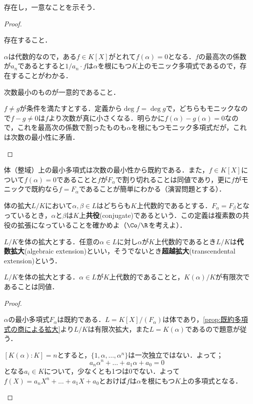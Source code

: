 存在し，一意なことを示そう．
\begin{proof}
	\begin{step}
		\item 存在すること．
		
		$\alpha$は代数的なので，ある$f\in K[X]$がとれて$f(\alpha)=0$となる．$f$の最高次の係数が$a_n$であるとすると$1/a_n\cdot f$は$\alpha$を根にもつ$K$上のモニック多項式であるので，存在することがわかる．
		
		\item 次数最小のものが一意的であること．
		
		$f\neq g$が条件を満たすとする．定義から$\deg f=\deg g$で，どちらもモニックなので$f-g\neq0 $は$f$より次数が真に小さくなる．明らかに$f(\alpha)-g(\alpha)=0$なので，これを最高次の係数で割ったものも$\alpha$を根にもつモニック多項式だが，これは次数の最小性に矛盾．
	\end{step}
\end{proof}

体（整域）上の最小多項式は次数の最小性から既約である．また，$f\in K[X]$について$f(\alpha)=0$であることと$f$が$F_\alpha$で割り切れることは同値であり，更に$f$がモニックで既約なら$f=F_\alpha$であることが簡単にわかる（演習問題とする）．

体の拡大$L/K$において$\alpha,\beta\in L$はどちらも$K$上代数的であるとする．$F_\alpha=F_\beta$となっているとき，$\alpha$と$\beta$は$K$上\textbf{共役}(conjugate)であるという．この定義は複素数の共役の拡張になっていることを確かめよ（$\Co/\R$を考えよ）．


\begin{defi}
	$L/K$を体の拡大とする．任意の$\alpha\in L$に対し$\alpha$が$K$上代数的であるとき$L/K$は\textbf{代数拡大}(algebraic extension)といい，そうでないとき\textbf{超越拡大}(transcendental extension)という．
\end{defi}

\begin{prop}
	$L/K$を体の拡大とする．$\alpha\in L$が$K$上代数的であることと，$K(\alpha)/K$が有限次であることは同値．
\end{prop}

\begin{proof}
	\begin{eqv}
		\item $\alpha$の最小多項式$F_\alpha$は既約である．$L=K[X]/(F_\alpha)$は体であり，\ref{prop:既約多項式の商による拡大}より$L/K$は有限次拡大，また$L=K(\alpha)$であるので題意が従う．
		
		\item $[K(\alpha):K]=n$とすると，$\{1,\alpha,\dots,\alpha^n\}$は一次独立ではない．よって；
		\[a_n\alpha^n+\dots+a_1\alpha+a_0=0\]
		となる$a_i\in K$について，少なくとも1つは0でない．よって$f(X)=a_nX^n+\dots+a_1X+a_0$とおけば$f$は$\alpha$を根にもつ$K$上の多項式となる．
	\end{eqv}
\end{proof}

